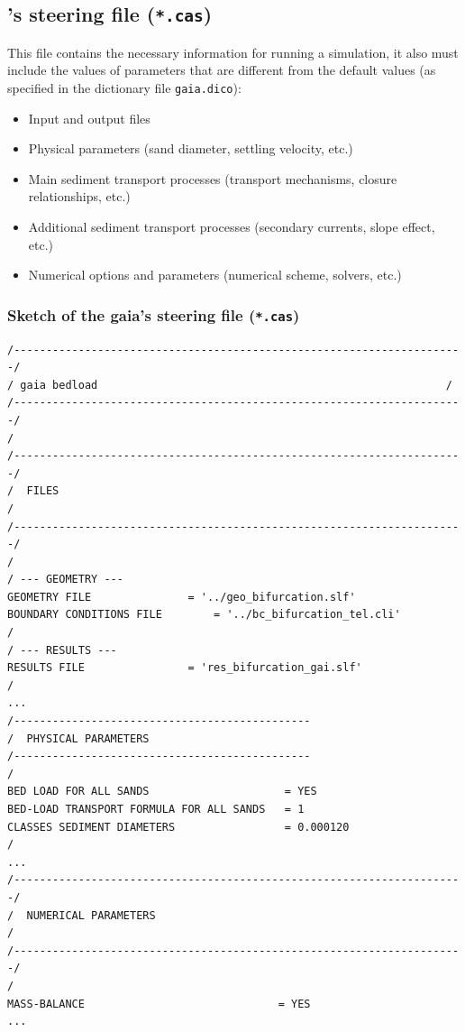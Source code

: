 \subsection{\gaia{}'s steering file (\texttt{*.cas})}
This file contains the necessary information for running a simulation, it also must include the values of parameters that are different from the default values (as specified in the dictionary file \texttt{gaia.dico}):
\begin{itemize}
\item Input and output files
\item Physical parameters (sand diameter, settling velocity, etc.)
\item Main sediment transport processes (transport mechanisms, closure relationships, etc.)
\item Additional sediment transport processes (secondary currents, slope effect, etc.)
\item Numerical options and parameters (numerical scheme, solvers, etc.)
\end{itemize}

\pagebreak

\subsubsection{Sketch of the gaia's steering file (\texttt{*.cas})}
\lstset{language=TelemacCas,
        basicstyle=\scriptsize\ttfamily}
\begin{lstlisting}[frame=trBL]
/----------------------------------------------------------------------/
/ gaia bedload                                                      /
/----------------------------------------------------------------------/
/
/----------------------------------------------------------------------/
/  FILES                                                               /
/----------------------------------------------------------------------/
/
/ --- GEOMETRY ---
GEOMETRY FILE				= '../geo_bifurcation.slf'
BOUNDARY CONDITIONS FILE		= '../bc_bifurcation_tel.cli'
/
/ --- RESULTS ---
RESULTS FILE				= 'res_bifurcation_gai.slf'
/
...
/----------------------------------------------
/  PHYSICAL PARAMETERS
/----------------------------------------------
/
BED LOAD FOR ALL SANDS                     = YES
BED-LOAD TRANSPORT FORMULA FOR ALL SANDS   = 1
CLASSES SEDIMENT DIAMETERS                 = 0.000120
/
...
/----------------------------------------------------------------------/
/  NUMERICAL PARAMETERS                                                /
/----------------------------------------------------------------------/
/
MASS-BALANCE                              = YES
...
\end{lstlisting}

